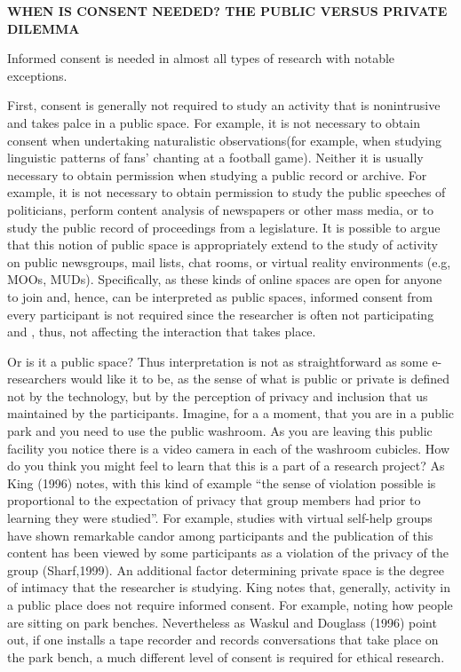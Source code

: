 \documentclass[]{article}
\begin{document}
\textbf{WHEN IS CONSENT NEEDED? THE PUBLIC VERSUS PRIVATE DILEMMA}

Informed consent is needed in almost all types of research with notable
exceptions.

First, consent is generally not required to study an activity that is
nonintrusive and takes palce in a public space. For example, it is not
necessary to obtain consent when undertaking naturalistic
observations(for example, when studying linguistic patterns of fans'
chanting at a football game). Neither it is usually necessary to obtain
permission when studying a public record or archive. For example, it is
not necessary to obtain permission to study the public speeches of
politicians, perform content analysis of newspapers or other mass media,
or to study the public record of proceedings from a legislature. It is
possible to argue that this notion of public space is appropriately
extend to the study of activity on public newsgroups, mail lists, chat
rooms, or virtual reality environments (e.g, MOOs, MUDs). Specifically,
as these kinds of online spaces are open for anyone to join and, hence,
can be interpreted as public spaces, informed consent from every
participant is not required since the researcher is often not
participating and , thus, not affecting the interaction that takes
place.

Or is it a public space? Thus interpretation is not as straightforward
as some e-researchers would like it to be, as the sense of what is
public or private is defined not by the technology, but by the
perception of privacy and inclusion that us maintained by the
participants. Imagine, for a a moment, that you are in a public park and
you need to use the public washroom. As you are leaving this public
facility you notice there is a video camera in each of the washroom
cubicles. How do you think you might feel to learn that this is a part
of a research project? As King (1996) notes, with this kind of example
``the sense of violation possible is proportional to the expectation of
privacy that group members had prior to learning they were studied''.
For example, studies with virtual self-help groups have shown remarkable
candor among participants and the publication of this content has been
viewed by some participants as a violation of the privacy of the group
(Sharf,1999). An additional factor determining private space is the
degree of intimacy that the researcher is studying. King notes that,
generally, activity in a public place does not require informed consent.
For example, noting how people are sitting on park benches. Nevertheless
as Waskul and Douglass (1996) point out, if one installs a tape recorder
and records conversations that take place on the park bench, a much
different level of consent is required for ethical research.
\end{document}
